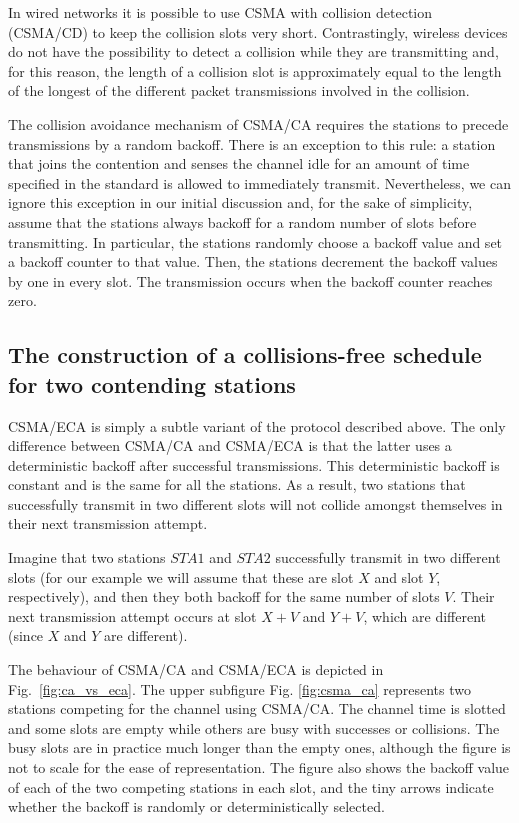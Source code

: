 \documentclass[journal]{IEEEtran}
\begin{document}
In wired networks it is possible to use CSMA with collision detection (CSMA/CD) to keep the collision slots very short.
Contrastingly, wireless devices do not have the possibility to detect a collision while they are transmitting and, for this reason, the length of a collision slot is approximately equal to the length of the longest of the different packet transmissions involved in the collision.

The collision avoidance mechanism of CSMA/CA requires the stations to precede transmissions by a random backoff.
There is an exception to this rule: a station that joins the contention and senses the channel idle for an amount of time specified in the standard is allowed to immediately transmit.
Nevertheless, we can ignore this exception in our initial discussion and, for the sake of simplicity, assume that the stations always backoff for a random number of slots before transmitting.
In particular, the stations randomly choose a backoff value and set a backoff counter to that value.
Then, the stations decrement the backoff values by one in every slot.
The transmission occurs when the backoff counter reaches zero.

\subsection{The construction of a collisions-free schedule for two contending stations}
CSMA/ECA is simply a subtle variant of the protocol described above.
The only difference between CSMA/CA and CSMA/ECA is that the latter uses a deterministic backoff after successful transmissions.
This deterministic backoff is constant and is the same for all the stations.
As a result, two stations that successfully transmit in two different slots will not collide amongst themselves in their next transmission attempt.

Imagine that two stations $STA1$ and $STA2$ successfully transmit in two different slots (for our example we will assume that these are slot $X$ and slot $Y$, respectively),  and then they both backoff for the same number of slots $V$.
Their next transmission attempt occurs at slot $X+V$ and $Y+V$, which are different (since $X$ and $Y$ are different).

The behaviour of CSMA/CA and CSMA/ECA is depicted in Fig.~\ref{fig:ca_vs_eca}.
The upper subfigure Fig. \ref{fig:csma_ca} represents two stations competing for the channel using CSMA/CA.
The channel time is slotted and some slots are empty while others are busy with successes or collisions.
The busy slots are in practice much longer than the empty ones, although the figure is not to scale for the ease of representation.
The figure also shows the backoff value of each of the two competing stations in each slot, and the tiny arrows indicate whether the backoff is randomly or deterministically selected.
\end{document}
